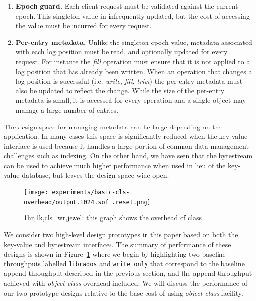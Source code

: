 \documentclass[10pt,twocolumn]{article}
\begin{document}
\begin{enumerate}
    \item {\bf Epoch guard.} Each client request must be validated against the
        current epoch. This singleton value in infrequently updated, but the
        cost of accessing the value must be incurred for every request.

    \item {\bf Per-entry metadata.} Unlike the singleton epoch value, metadata
        associated with each log position must be read, and optionally updated
        for every request. For instance the \emph{fill} operation must ensure
        that it is not applied to a log position that has already been
        written. When an operation that changes a log position is successful
        (i.e. \emph{write}, \emph{fill}, \emph{trim}) the per-entry metadata
        must also be updated to reflect the change. While the size of the
        per-entry metadata is small, it is accessed for every operation and a
        single object may manage a large number of entries.
\end{enumerate}

The design space for managing metadata can be large depending on the
application. In many cases this space is significantly reduced when the
key-value interface is used because it handles a large portion of common data
management challenges such as indexing. On the other hand, we have seen that
the bytestream can be used to achieve much higher performance when used in
lieu of the key-value database, but leaves the design space wide open.

\begin{figure}[t]
	\centering
	\texttt{[image: experiments/basic-cls-overhead/output.1024.soft.reset.png]}	
	\caption{1hr,1k,cls\_wr,jewel: this graph shows the overhead of class}
	\label{fig:cls_wr_jewel}
\end{figure}

We consider two high-level design prototypes in this paper based on both the
key-value and bytestream interfaces. The summary of performance of these
designs is shown in Figure~\ref{fig:cls_wr_jewel} where we begin by
highlighting two baseline throughputs labelled \texttt{librados} and
\texttt{write only} that correspond to the baseline append throughput described
in the previous section, and the append throughput achieved with \emph{object
class} overhead included. We will discuss the performance of our two prototype
designs relative to the base cost of using \emph{object class} facility.
\end{document}
